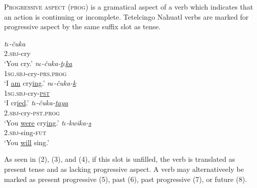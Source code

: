 \documentclass[doc,12pt]{apa6}
\begin{document}
\textsc{Progressive aspect} (\textsc{prog}) is a gramatical aspect of a verb which
indicates that an action is continuing or incomplete. Tetelcingo Nahuatl verbs
are marked for progressive aspect by the same suffix slot as tense.

\begin{exe}
	\ex 
	\gll \textit{t$\iota$-\v{c}uka} \\
	\textsc{2.sbj}-cry \\
	\trans `You cry.'
	\ex 
	\gll \textit{n$\iota$-\v{c}uka-\underline{t$\iota$ka}} \\
	\textsc{1sg.sbj}-cry-\textsc{prs.prog} \\
	\trans `I \underline{am} cry\underline{ing}.'
	\ex 
	\gll \textit{n$\iota$-\v{c}uka-\underline{k}} \\
	\textsc{1sg.sbj}-cry-\underline{\textsc{pst}} \\
	\trans `I cr\underline{ied}.'
	\ex 
	\gll \textit{t$\iota$-\v{c}uka-\underline{taya}} \\
	\textsc{2.sbj}-cry-\textsc{pst.prog} \\
	\trans `You \underline{were} cry\underline{ing}.'
	\ex 
	\gll \textit{t$\iota$-kwika-\underline{s}} \\
	\textsc{2.sbj}-sing-\textsc{fut} \\
	\trans `You \underline{will} sing.'
\end{exe}

As seen in (2), (3), and (4), if this slot is unfilled, the verb is translated
as present tense and as lacking progressive aspect. A verb may alternativeely
be marked as present progressive (5), past (6), past progressive (7), or future
(8).
\end{document}
